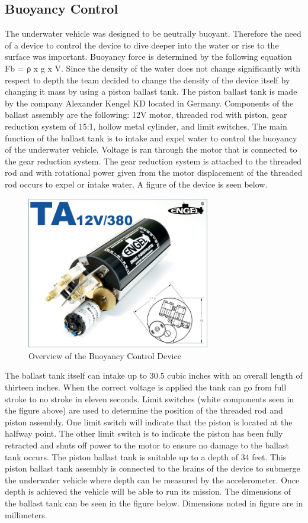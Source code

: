 \documentclass{report}
\begin{document}
\subsection{Buoyancy Control}
The underwater vehicle was designed to be neutrally buoyant. Therefore the need of a device to control the device to dive deeper into the water or rise to the surface was important. Buoyancy force is determined by the following equation Fb = ρ x g x V. Since the density of the water does not change significantly with respect to depth the team decided to change the density of the device itself by changing it mass by using a piston ballast tank. The piston ballast tank is made by the company Alexander Kengel KD located in Germany. Components of the ballast assembly are the following: 12V motor, threaded rod with piston, gear reduction system of 15:1, hollow metal cylinder, and limit switches. The main function of the ballast tank is to intake and expel water to control the buoyancy of the underwater vehicle. Voltage is ran through the motor that is connected to the gear reduction system. The gear reduction system is attached to the threaded rod and with rotational power given from the motor displacement of the threaded rod occurs to expel or intake water. A figure of the device is seen below.
\begin{figure}[h]
\centering
\includegraphics[width=8cm]{bcOverview}
\caption{Overview of the Buoyancy Control Device}
\end{figure}
The ballast tank itself can intake up to 30.5 cubic inches with an overall length of thirteen inches.  When the correct voltage is applied the tank can go from full stroke to no stroke in eleven seconds.  Limit switches (white components seen in the figure above) are used to determine the position of the threaded rod and piston assembly. One limit switch will indicate that the piston is located at the halfway point. The other limit switch is to indicate the piston has been fully retracted and shuts off power to the motor to ensure no damage to the ballast tank occurs. The piston ballast tank is suitable up to a depth of 34 feet. This piston ballast tank assembly is connected to the brains of the device to submerge the underwater vehicle where depth can be measured by the accelerometer.  Once depth is achieved the vehicle will be able to run its mission. The dimensions of the ballast tank can be seen in the figure below. Dimensions noted in figure are in millimeters.
\end{document}
